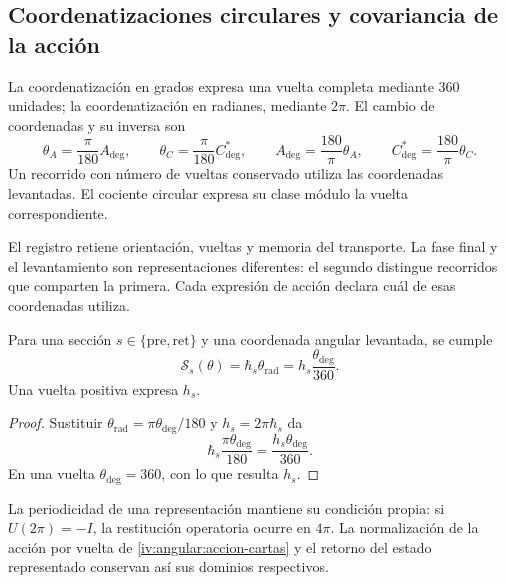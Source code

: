 \subsection{Coordenatizaciones circulares y covariancia de la acción}
\label{iv:angular:cartas}

\begin{definition}
\label{iv:angular:unidades}
La coordenatización en grados expresa una vuelta completa mediante \(360\)
unidades; la coordenatización en radianes, mediante \(2\pi\). El cambio
de coordenadas y su inversa son
\begin{equation}
 \theta_A=\frac{\pi}{180}A_{\deg},\qquad
 \theta_C=\frac{\pi}{180}C^*_{\deg},\qquad
 A_{\deg}=\frac{180}{\pi}\theta_A,\qquad
 C^*_{\deg}=\frac{180}{\pi}\theta_C.
 \label{iv:angular:cambio-carta}
\end{equation}
Un recorrido con número de vueltas conservado utiliza las
coordenadas levantadas. El cociente circular expresa su
clase módulo la vuelta correspondiente.
\end{definition}

El registro retiene orientación, vueltas y memoria del transporte.
La fase final y el levantamiento son representaciones diferentes:
el segundo distingue recorridos que comparten la primera.
Cada expresión de acción declara cuál de esas coordenadas utiliza.

\begin{proposition}
\label{iv:angular:accion}
Para una sección \(s\in\{\mathrm{pre},\mathrm{ret}\}\) y una
coordenada angular levantada, se cumple
\begin{equation}
 \mathcal S_s(\theta)
 =\hbar_s\theta_{\mathrm{rad}}
 =h_s\frac{\theta_{\deg}}{360}.
 \label{iv:angular:accion-cartas}
\end{equation}
Una vuelta positiva expresa \(h_s\).
\end{proposition}
\begin{proof}
Sustituir
\(\theta_{\mathrm{rad}}=\pi\theta_{\deg}/180\) y
\(h_s=2\pi\hbar_s\) da
\[
 \hbar_s\frac{\pi\theta_{\deg}}{180}
 =\frac{h_s\theta_{\deg}}{360}.
\]
En una vuelta \(\theta_{\deg}=360\), con lo que resulta \(h_s\).
\end{proof}

La periodicidad de una representación mantiene su condición
propia: si \(U(2\pi)=-I\), la restitución operatoria ocurre
en \(4\pi\). La normalización de la acción por vuelta de
\eqref{iv:angular:accion-cartas} y el retorno del estado
representado conservan así sus dominios respectivos.

